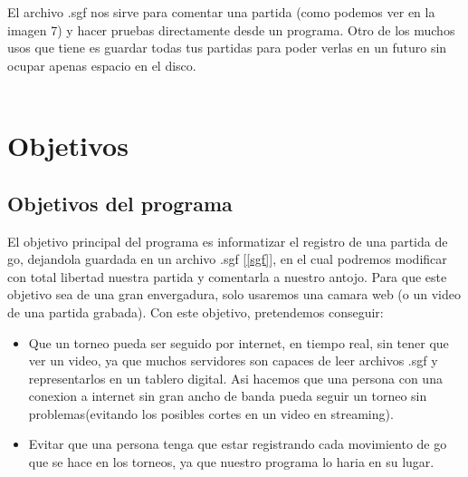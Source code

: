 \documentclass[12pt,a4paper]{report}
\begin{document}
El archivo .sgf nos sirve para comentar una partida (como podemos ver en la imagen 7) y hacer pruebas directamente desde un programa. Otro de los muchos usos que tiene es guardar todas tus partidas para poder verlas en un futuro sin ocupar apenas espacio en el disco. \\ \\



\chapter{Objetivos}
\section{Objetivos del programa}
El objetivo principal del programa es informatizar el registro de una partida de go, dejandola guardada en un archivo .sgf [\ref{sgf}], en el cual podremos modificar con total libertad nuestra partida y comentarla a nuestro antojo. Para que este objetivo sea de una gran envergadura, solo usaremos una camara web (o un video de una partida grabada). Con este objetivo, pretendemos conseguir:
\begin{itemize}
\item Que un torneo pueda ser seguido por internet, en tiempo real, sin tener que ver un video, ya que muchos servidores son capaces de leer archivos .sgf y representarlos en un tablero digital. Asi hacemos que una persona con una conexion a internet sin gran ancho de banda pueda seguir un torneo sin problemas(evitando los posibles cortes en un video en streaming).
\item Evitar que una persona tenga que estar registrando cada movimiento de go que se hace en los torneos, ya que nuestro programa lo haria en su lugar.
\end{itemize}
\end{document}
